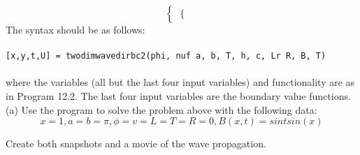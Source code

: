 \documentclass[../main.tex]{subfiles}
\begin{document}
\begin{enumerate}
$$\begin{cases}
\begin{cases}
		\end{cases} 
	\end{cases}$$
The syntax should be as follows: 
\\
\\
\texttt{[x,y,t,U] = twodimwavedirbc2(phi, nuf a, b, T, h, c, Lr R, B, T) }
\\
\\
where the variables (all but the last four input variables) and functionality are as in Program 
12.2. The last four input variables are the boundary value functions. 
\\
(a) Use the program to solve the problem above with the following data: 
$$x=1,a=b= \pi, \phi=v=L=T=R=0, B(x,t)=sin t sin(x) $$


Create both snapshots and a movie of the wave propagation.



\end{enumerate}
\end{document}
